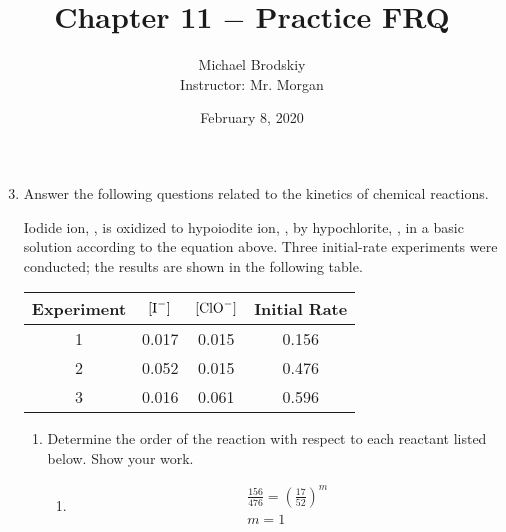 \documentclass[12pt]{article}
\title{Chapter 11 $-$ Practice FRQ}
\date{February 8, 2020}
\author{Michael Brodskiy\\ \small Instructor: Mr. Morgan}
\begin{document}
\maketitle

\begin{enumerate}

    \setcounter{enumi}{2}

  \item Answer the following questions related to the kinetics of chemical reactions.

    \begin{center}
    \end{center}

    \begin{center}
      Iodide ion, , is oxidized to hypoiodite ion, , by hypochlorite, , in a basic solution according to the equation above. Three initial-rate experiments were conducted; the results are shown in the following table.\\
      \begin{tabular}[H]{|c|c|c|c|}
        \hline
        \rowcolor{cadetgrey} Experiment & $[\ce{I-}]$ & $[\ce{ClO-}]$ & Initial Rate \\
        \hline
        1 & 0.017 & 0.015 & 0.156 \\
        \hline
        2 & 0.052 & 0.015 & 0.476 \\
        \hline
        3 & 0.016 & 0.061 & 0.596 \\
        \hline
      \end{tabular}
    \end{center}

    \begin{enumerate}

      \item Determine the order of the reaction with respect to each reactant listed below. Show your work.

        \begin{enumerate}

          \item {}

            \begin{equation}
              \begin{split}
              \frac{156}{476}=\left(\frac{17}{52}\right)^m\\
              m=1\\
              \end{split}
              \label{1}
            \end{equation}


\end{enumerate}
\end{enumerate}
\end{enumerate}
\end{document}
